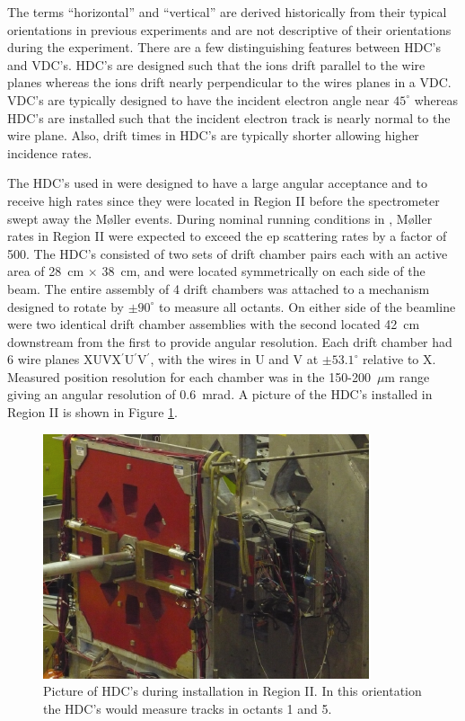 The terms ``horizontal'' and ``vertical'' are derived historically from their typical orientations in previous experiments and are not descriptive of their orientations during the \Qs experiment. There are a few distinguishing features between HDC's and VDC's. HDC's are designed such that the ions drift parallel to the wire planes whereas the ions drift nearly perpendicular to the wires planes in a VDC. VDC's are typically designed to have the incident electron angle near $45^{\circ}$ whereas HDC's are installed such that the incident electron track is nearly normal to the wire plane. Also, drift times in HDC's are typically shorter allowing higher incidence rates. 

The HDC's used in \Qs were designed to have a large angular acceptance and to receive high rates since they were located in Region II before the spectrometer swept away the M\o ller events. During nominal running conditions in \Q, M\o ller rates in Region II were expected to exceed the ep scattering rates by a factor of 500. The HDC's consisted of two sets of drift chamber pairs each with an active area of 28~cm $\times$ 38~cm, and were located symmetrically on each side of the beam. The entire assembly of 4 drift chambers was attached to a mechanism designed to rotate by $\pm90^{\circ}$ to measure all octants. On either side of the beamline were two identical drift chamber assemblies with the second located 42~cm downstream from the first to provide angular resolution. Each drift chamber had 6 wire planes XUVX$^{\prime}$U$^{\prime}$V$^{\prime}$, with the wires in U and V at $\pm53.1^{\circ}$  relative to X. Measured position resolution for each chamber was in the 150-200~$\mu$m range giving an angular resolution of 0.6~mrad. A picture of the HDC's installed in Region II is shown in Figure \ref{fig:HDCs}.
\begin{figure}[ht]
\centering
\includegraphics{Pictures/HDCs.png}
\caption{Picture of HDC's during installation in Region II. In this orientation the HDC's would measure tracks in octants 1 and 5.}
\label{fig:HDCs}
\end{figure}

